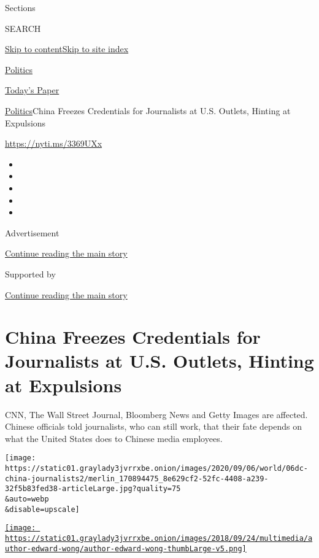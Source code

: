 Sections

SEARCH

\protect\hyperlink{site-content}{Skip to
content}\protect\hyperlink{site-index}{Skip to site index}

\href{https://www.nytimes3xbfgragh.onion/section/politics}{Politics}

\href{https://myaccount.nytimes3xbfgragh.onion/auth/login?response_type=cookie\&client_id=vi}{}

\href{https://www.nytimes3xbfgragh.onion/section/todayspaper}{Today's
Paper}

\href{/section/politics}{Politics}\textbar{}China Freezes Credentials
for Journalists at U.S. Outlets, Hinting at Expulsions

\url{https://nyti.ms/3369UXx}

\begin{itemize}
\item
\item
\item
\item
\item
\end{itemize}

Advertisement

\protect\hyperlink{after-top}{Continue reading the main story}

Supported by

\protect\hyperlink{after-sponsor}{Continue reading the main story}

\hypertarget{china-freezes-credentials-for-journalists-at-us-outlets-hinting-at-expulsions}{%
\section{China Freezes Credentials for Journalists at U.S. Outlets,
Hinting at
Expulsions}\label{china-freezes-credentials-for-journalists-at-us-outlets-hinting-at-expulsions}}

CNN, The Wall Street Journal, Bloomberg News and Getty Images are
affected. Chinese officials told journalists, who can still work, that
their fate depends on what the United States does to Chinese media
employees.

\texttt{[image: https://static01.graylady3jvrrxbe.onion/images/2020/09/06/world/06dc-china-journalists2/merlin\_170894475\_8e629cf2-52fc-4408-a239-32f5b83fed38-articleLarge.jpg?quality=75\\\&auto=webp\\\&disable=upscale]}

\href{https://www.nytimes3xbfgragh.onion/by/edward-wong}{\texttt{[image: https://static01.graylady3jvrrxbe.onion/images/2018/09/24/multimedia/author-edward-wong/author-edward-wong-thumbLarge-v5.png]}}


